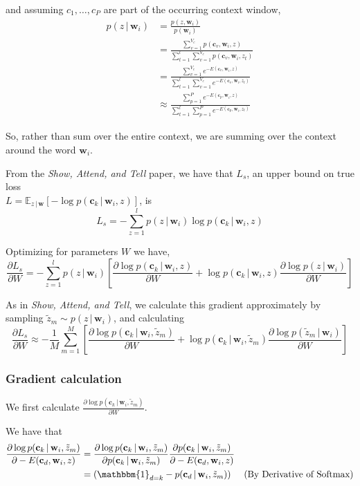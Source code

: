 \documentclass{article} %
\begin{document}
and assuming $c_1, \ldots, c_P$ are part of the occurring context window,
\begin{align*}
p(z \, | \, \mathbf{w}_i) &= \frac{p(z, \mathbf{w}_i)}{p(\mathbf{w}_i)} \\
&= \frac{\sum_{v=1}^{V_c} p(\mathbf{c}_v, \mathbf{w}_i, z)}
{\sum_{t=1}^{l} \sum_{v=1}^{V_c} p(\mathbf{c}_v, \mathbf{w}_i, z_t)} \\
&= \frac{\sum_{v=1}^{V_c} e^{-E(\mathbf{c}_v, \mathbf{w}_i, z)}}
{\sum_{t=1}^{l} \sum_{v=1}^{V_c} e^{-E(\mathbf{c}_v, \mathbf{w}_i, z_t)}} \\
&\approx \frac{\sum_{p=1}^{P} e^{-E(\mathbf{c}_p, \mathbf{w}_i, z)}} 
{\sum_{t=1}^{l} \sum_{p=1}^{P} e^{-E(\mathbf{c}_p, \mathbf{w}_i, z_t)}}
\end{align*}

So, rather than sum over the entire context, we are summing over the context
around the word $\mathbf{w}_i$.

From the \emph{Show, Attend, and Tell} paper, we have that $L_{s}$, an upper bound on 
true loss \\
$L = \mathbb{E}_{z \, | \, \mathbf{w}} [-\log p(\mathbf{c}_k \, | \, \mathbf{w}_i, z)]$, is
$$
L_{s} = -\sum_{z=1}^{l} p(z \, | \, \mathbf{w}_i) \log p(\mathbf{c}_k \, | \, \mathbf{w}_i , z)
$$

Optimizing for parameters $W$ we have,
$$
\frac{\partial L_{s}}{\partial W} = -\sum_{z=1}^{l} p(z \, | \, \mathbf{w}_i)  
\left[
\frac{\partial \log p(\mathbf{c}_k \, | \, \mathbf{w}_i , z)}{\partial W} +
\log p(\mathbf{c}_k \, | \, \mathbf{w}_i , z)
\frac{\partial \log  p(z \, | \, \mathbf{w}_i)}{\partial W}
\right]
$$

As in \emph{Show, Attend, and Tell}, we calculate this gradient approximately by sampling
$\tilde{z}_m \sim p(z \, | \, \mathbf{w}_i)$, and calculating
$$
\frac{\partial L_{s}}{\partial W} \approx - \frac{1}{M} \sum_{m=1}^{M} 
\left[
\frac{\partial \log p(\mathbf{c}_k \, | \, \mathbf{w}_i , \tilde{z}_m)}{\partial W} +
\log p(\mathbf{c}_k \, | \, \mathbf{w}_i , \tilde{z}_m)
\frac{\partial \log  p(\tilde{z}_m \, | \, \mathbf{w}_i)}{\partial W}
\right]
$$

\subsubsection{Gradient calculation}
We first calculate $\frac{\partial \log p(\mathbf{c}_k \, | \, \mathbf{w}_i , \tilde{z}_m)}{\partial W}$. 

We have that 
\begin{align*}
 \frac{\partial \log p(\mathbf{c}_k \, | \, \mathbf{w}_i , \tilde{z}_m)}{\partial -E(\mathbf{c}_d, \mathbf{w}_i, z)} &= 
\frac{\partial \log p(\mathbf{c}_k \, | \, \mathbf{w}_i , \tilde{z}_m)}{\partial p(\mathbf{c}_k \, | \, \mathbf{w}_i , \tilde{z}_m)}
\frac{\partial p(\mathbf{c}_k \, | \, \mathbf{w}_i , \tilde{z}_m)}{\partial -E(\mathbf{c}_d, \mathbf{w}_i, z)} \\
&= (\mathbbm{1}_{d = k} - p(\mathbf{c}_d \, | \, \mathbf{w}_i , \tilde{z}_m)) & \text{(By Derivative of Softmax)}
\end{align*}
\end{document}
